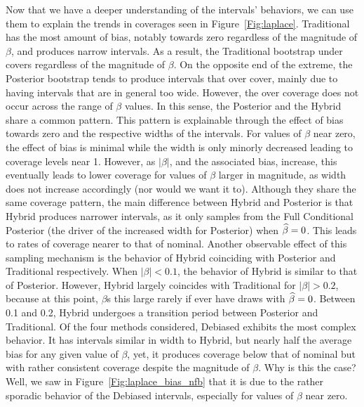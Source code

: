 Now that we have a deeper understanding of the intervals' behaviors, we can use them to explain the trends in coverages seen in Figure~\ref{Fig:laplace}. Traditional has the most amount of bias, notably towards zero regardless of the magnitude of $\beta$, and produces narrow intervals. As a result, the Traditional bootstrap under covers regardless of the magnitude of $\beta$. On the opposite end of the extreme, the Posterior bootstrap tends to produce intervals that over cover, mainly due to having intervals that are in general too wide. However, the over coverage does not occur across the range of $\beta$ values. In this sense, the Posterior and the Hybrid share a common pattern. This pattern is explainable through the effect of bias towards zero and the respective widths of the intervals. For values of $\beta$ near zero, the effect of bias is minimal while the width is only minorly decreased leading to coverage levels near 1. However, as $|\beta|$, and the associated bias, increase, this eventually leads to lower coverage for values of $\beta$ larger in magnitude, as width does not increase accordingly (nor would we want it to). Although they share the same coverage pattern, the main difference between Hybrid and Posterior is that Hybrid produces narrower intervals, as it only samples from the Full Conditional Posterior (the driver of the increased width for Posterior) when $\widehat{\beta} = 0$. This leads to rates of coverage nearer to that of nominal. Another observable effect of this sampling mechanism is the behavior of Hybrid coinciding with Posterior and Traditional respectively. When $|\beta| < 0.1$, the behavior of Hybrid is similar to that of Posterior. However, Hybrid largely coincides with Traditional for $|\beta| > 0.2$, because at this point, $\beta$s this large rarely if ever have draws with $\widehat{\beta} = 0$. Between 0.1 and 0.2, Hybrid undergoes a transition period between Posterior and Traditional. Of the four methods considered, Debiased exhibits the most complex behavior. It has intervals similar in width to Hybrid, but nearly half the average bias for any given value of $\beta$, yet, it produces coverage below that of nominal but with rather consistent coverage despite the magnitude of $\beta$. Why is this the case? Well, we saw in Figure~\ref{Fig:laplace_bias_nfb} that it is due to the rather sporadic behavior of the Debiased intervals, especially for values of $\beta$ near zero. 

